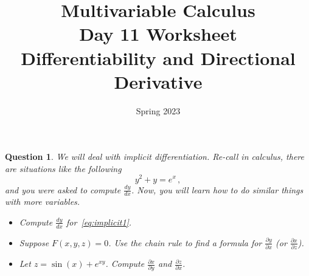 \documentclass{amsart}
\title{ Multivariable Calculus \\ Day 11 Worksheet \\ Differentiability and  Directional Derivative }
\date{Spring 2023}
\newtheorem{question}{Question}
\theoremstyle{definition}
\begin{document}
\maketitle

\begin{question}
    We will deal with implicit differentiation.
    Re-call in calculus, there are situations like the following
    \begin{equation}
        \label{eq:implicit1}
        y^2 + y = e^x \,,
    \end{equation}
    and you were asked to compute $\frac{dy}{dx}$.
    Now, you will learn how to do similar things with more variables.
    \begin{itemize}
    \item Compute $\frac{dy}{dx}$ for~\eqref{eq:implicit1}.
    \item Suppose  $F(x,y,z) = 0$.
        Use the chain rule to find a formula for $\frac{\partial y}{\partial x}$ 
        (or $\frac{\partial x}{\partial z}$).
    \item Let $z = \sin(x) + e^{xy}$.
        Compute $\frac{\partial x}{\partial y}$ and $\frac{\partial z}{\partial x}$.
    \end{itemize}
\end{question}
\end{document}
